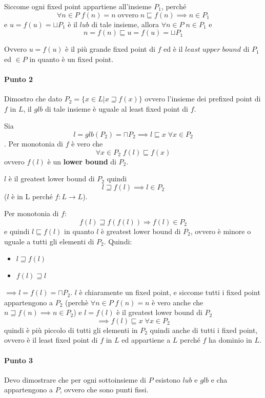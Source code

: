 \documentclass{article}
\newcommand{\pd}{P_{2}}
\begin{document}
Siccome ogni fixed point appartiene all'insieme $P_{1}$, perché $$\forall n \in P \; f(n)=n  \;\text{ovvero} \; n \sqsubseteq f(n) \implies n \in P_{1}$$ e $u=f(u)=\sqcup P_{1}$ è il $lub$ di tale insieme, allora $\forall n \in P \; n \in P_{1} $ e $$n = f(n) \sqsubseteq u = f(u) =\sqcup P_{1}$$

Ovvero $u=f(u)$  è il più grande fixed point di $f$ ed è il $least\; upper\; bound$ di $P_{1}$ ed $\in P$ in quanto è un fixed point. 

\paragraph{Punto 2} Dimostro che dato $\pd = \{x \in L | x \sqsupseteq f(x) \}$ ovvero l'insieme dei prefixed point di $f$ in $L$, il $glb$ di tale insieme è uguale al least fixed point di $f$.


Sia $$l =glb(\pd)= \sqcap \pd \implies l \sqsubseteq x \; \forall x \in \pd$$. Per monotonia di $f$ è vero che $$\forall x \in \pd \; f(l) \sqsubseteq f(x)$$ ovvero $f(l)$ è un \textbf{lower bound} di $\pd$.

$l$ è il greatest lower bound di $\pd$ quindi $$l \sqsupseteq f(l) \implies l \in \pd$$ ($l$ è in L perché $f:L\to L$).

Per monotonia di $f$: $$f(l) \sqsupseteq f(f(l)) \Rightarrow f(l) \in \pd$$ e quindi $l\sqsubseteq f(l)$ in quanto $l$ è greatest lower bound di $\pd$, ovvero è minore o uguale a tutti gli elementi di $\pd$. Quindi:
\begin{itemize}
    \item $l\sqsupseteq f(l)$
    \item $f(l) \sqsupseteq l$
\end{itemize}
$\implies l = f(l) = \sqcap \pd $. $ l $ è chiaramente un fixed point, e siccome tutti i fixed point appartengono a $ \pd $ (perchè $ \forall n \in P \; f(n) = n $ è vero anche che $ n \sqsupseteq f(n) \implies n \in P_{2} $) e $l=f(l)$ è il greatest lower bound di $\pd$ $$\implies f(l) \sqsubseteq x \; \forall x \in \pd $$ quindi è più piccolo di tutti gli elementi in $\pd$ quindi anche di tutti i fixed point, ovvero è il least fixed point di $f$ in $L$ ed appartiene a $L$ perché $f$ ha dominio in $L$.

\paragraph{Punto 3}
Devo dimostrare che per ogni sottoinsieme di $P$ esistono $lub$ e $glb$ e cha appartengono a $P$, ovvero che sono punti fissi.
\end{document}
